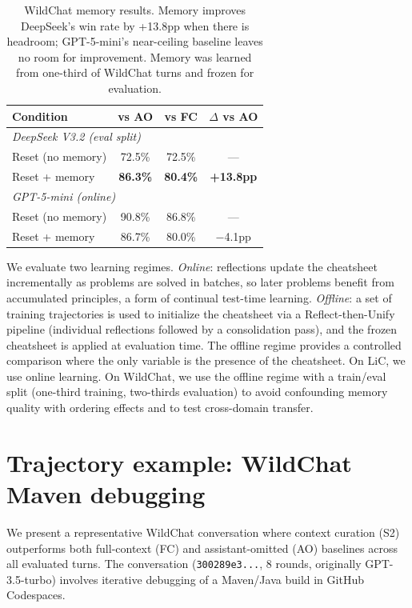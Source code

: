 \documentclass{article}
\begin{document}
\begin{table}[h]
\centering
\begin{tabular}{lccc}
\toprule
\textbf{Condition} & \textbf{vs AO} & \textbf{vs FC} & \textbf{$\Delta$ vs AO} \\
\midrule
\multicolumn{4}{l}{\emph{DeepSeek V3.2 (eval split)}} \\
\quad Reset (no memory) & 72.5\% & 72.5\% & --- \\
\quad Reset + memory & \textbf{86.3\%} & \textbf{80.4\%} & \textbf{+13.8pp} \\
\midrule
\multicolumn{4}{l}{\emph{GPT-5-mini (online)}} \\
\quad Reset (no memory) & 90.8\% & 86.8\% & --- \\
\quad Reset + memory & 86.7\% & 80.0\% & $-$4.1pp \\
\bottomrule
\end{tabular}
\caption{WildChat memory results. Memory improves DeepSeek's win rate by +13.8pp when there is headroom; GPT-5-mini's near-ceiling baseline leaves no room for improvement. Memory was learned from one-third of WildChat turns and frozen for evaluation.}
\label{tab:wildchat-memory}
\end{table}

We evaluate two learning regimes. \emph{Online}: reflections update the cheatsheet incrementally as problems are solved in batches, so later problems benefit from accumulated principles, a form of continual test-time learning. \emph{Offline}: a set of training trajectories is used to initialize the cheatsheet via a Reflect-then-Unify pipeline (individual reflections followed by a consolidation pass), and the frozen cheatsheet is applied at evaluation time. The offline regime provides a controlled comparison where the only variable is the presence of the cheatsheet. On LiC, we use online learning. On WildChat, we use the offline regime with a train/eval split (one-third training, two-thirds evaluation) to avoid confounding memory quality with ordering effects and to test cross-domain transfer.


\section{Trajectory example: WildChat Maven debugging}
\label{app:trajectories}

We present a representative WildChat conversation where context curation (S2) outperforms both full-context (FC) and assistant-omitted (AO) baselines across all evaluated turns. The conversation (\texttt{300289e3...}, 8 rounds, originally GPT-3.5-turbo) involves iterative debugging of a Maven/Java build in GitHub Codespaces.
\end{document}
